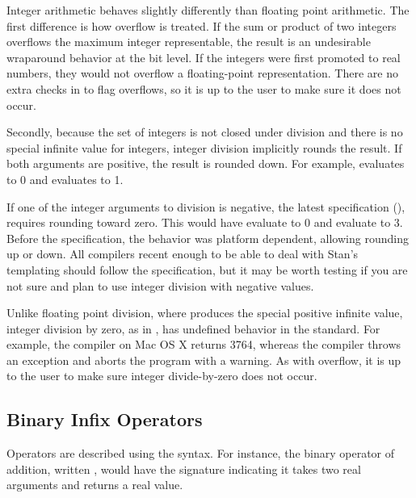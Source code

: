 Integer arithmetic behaves slightly differently than floating point
arithmetic.  The first difference is how overflow is treated.  If the
sum or product of two integers overflows the maximum integer
representable, the result is an undesirable wraparound behavior at the
bit level.  If the integers were first promoted to real numbers, they
would not overflow a floating-point representation.  There are no
extra checks in \Stan to flag overflows, so it is up to the user to
make sure it does not occur.

Secondly, because the set of integers is not closed under division and
there is no special infinite value for integers, integer division
implicitly rounds the result.  If both arguments are positive, the
result is rounded down.  For example,  evaluates to 0 and
 evaluates to 1.  

If one of the integer arguments to division is negative, the latest
\Cpp specification (), requires rounding toward zero.  This
would have  evaluate to 0 and  evaluate to
3.  Before the  specification, the behavior was platform
dependent, allowing rounding up or down.  All compilers recent enough
to be able to deal with Stan's templating should follow the 
specification, but it may be worth testing if you are not sure and
plan to use integer division with negative values.

Unlike floating point division, where  produces the
special positive infinite value, integer division by zero, as in
, has undefined behavior in the \Cpp standard.  For
example, the \clang compiler on Mac OS X returns 3764, whereas the
\gpp compiler throws an exception and aborts the program with a
warning.  As with overflow, it is up to the user to make sure integer
divide-by-zero does not occur.

\subsection{Binary Infix Operators}

Operators are described using the \Cpp syntax.  For instance, the
binary operator of addition, written , would have the
\Stan signature  indicating it takes
two real arguments and returns a real value.

\begin{description}
%
%
%
%
%
\end{description}

